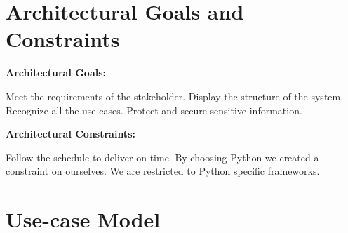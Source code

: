 \documentclass{article}
\begin{document}
\newpage

\section*{Architectural Goals and Constraints}
\begin{flushleft}
\textbf{Architectural Goals:}\\ 

\end{flushleft}
\begin{outline}
    \1 Meet the requirements of the stakeholder.  
    \1 Display the structure of the system.
    \1 Recognize all the use-cases.
    \1 Protect and secure sensitive information. 
\end{outline}
\begin{flushleft}
\textbf{Architectural Constraints:}\\ 

\end{flushleft}
\begin{outline}
    \1 Follow the schedule to deliver on time.
    \1 By choosing Python we created a constraint on ourselves. We are restricted to Python specific frameworks.
\end{outline}

\newpage

\section*{Use-case Model}


\begin{figure}[h]
  \noindent{}
\end{figure} 
\end{document}
